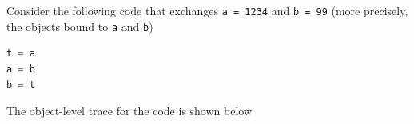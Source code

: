 \documentclass[8pt,a4paper,compress]{beamer}
\begin{document}
\begin{frame}[fragile]
Consider the following code that exchanges \lstinline{a = 1234} and \lstinline{b = 99} (more precisely, the objects bound to \lstinline{a} and \lstinline{b})

\begin{lstlisting}[language=Python]
t = a
a = b
b = t
\end{lstlisting}

\pause
\bigskip

The object-level trace for the code is shown below
\begin{center}
\end{center}
\end{frame}
\end{document}
